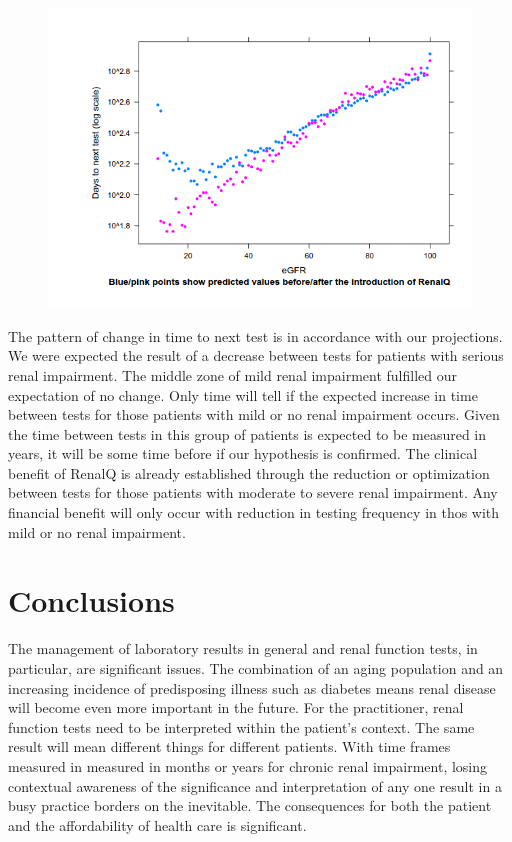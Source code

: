 ﻿\documentclass[11pt]{article}
\begin{document}
\begin{figure}[htp]
\centering
\includegraphics[scale=0.50]{FigCritical.png}
\caption{}
\label{}
\end{figure}

The pattern of change in time to next test is in accordance with our projections. We were expected the result of a decrease between tests for patients with serious renal impairment. The middle zone of mild renal impairment fulfilled our expectation of no change. Only time will tell if the expected increase in time between tests for those patients with mild or no renal impairment occurs. Given the time between tests in this group of patients is expected to be measured in years, it will be some time before if our hypothesis is confirmed. The clinical benefit of RenalQ is already established through the reduction or optimization between tests for those patients with moderate to severe renal impairment. Any financial benefit will only occur with reduction in testing frequency in thos with mild or no renal impairment.

\section{Conclusions}
The management of laboratory results in general and renal function tests, in particular, are significant issues. The combination of an aging population and an increasing incidence of predisposing illness such as diabetes means renal disease will become even more important in the future. For the practitioner, renal function tests need to be interpreted within the patient's context. The same result will mean different things for different patients. With time frames measured in measured in months or years for chronic renal impairment, losing contextual awareness of the significance and interpretation of any one result in a busy practice borders on the inevitable. The consequences for both the patient and the affordability of health care is significant.\\
\end{document}

